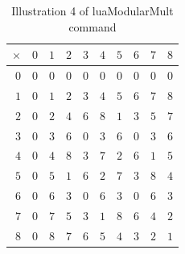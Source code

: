 ﻿\documentclass{article}
\begin{document}
\begin{table}[H]
\centering
\begin{tabular}{r|rrrrrrrrr}
\hline
$\times$ & $0$ & $1$ & $2$ & $3$ & $4$ & $5$ & $6$ & $7$ & $8$\\ \hline$0$ & $0$ & $0$ & $0$ & $0$ & $0$ & $0$ & $0$ & $0$ & $0$\\ $1$ & $0$ & $1$ & $2$ & $3$ & $4$ & $5$ & $6$ & $7$ & $8$\\ $2$ & $0$ & $2$ & $4$ & $6$ & $8$ & $1$ & $3$ & $5$ & $7$\\ $3$ & $0$ & $3$ & $6$ & $0$ & $3$ & $6$ & $0$ & $3$ & $6$\\ $4$ & $0$ & $4$ & $8$ & $3$ & $7$ & $2$ & $6$ & $1$ & $5$\\ $5$ & $0$ & $5$ & $1$ & $6$ & $2$ & $7$ & $3$ & $8$ & $4$\\ $6$ & $0$ & $6$ & $3$ & $0$ & $6$ & $3$ & $0$ & $6$ & $3$\\ $7$ & $0$ & $7$ & $5$ & $3$ & $1$ & $8$ & $6$ & $4$ & $2$\\ $8$ & $0$ & $8$ & $7$ & $6$ & $5$ & $4$ & $3$ & $2$ & $1$ \\
\hline
\end{tabular} 

\caption{Illustration 4 of luaModularMult command}
\label{luamodmult4tbl}
\end{table}
\end{document}
